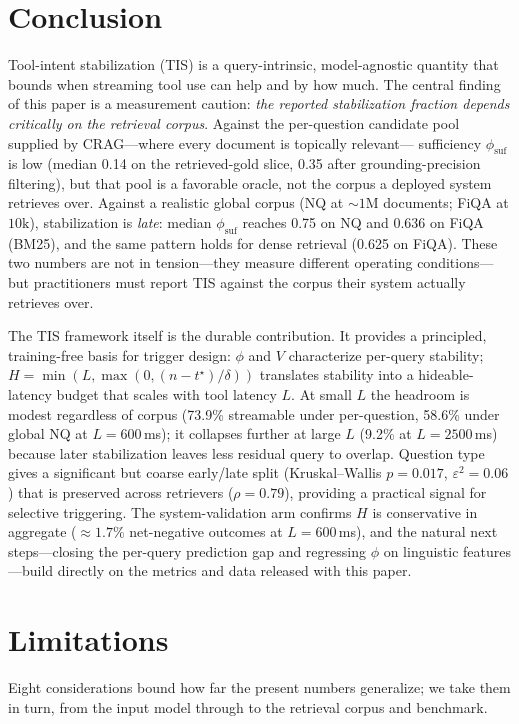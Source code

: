 \documentclass[11pt]{article}
\newcommand{\phiSufMed}{0.14}
\newcommand{\phiSufCleanMed}{0.35}   %
\newcommand{\streamPct}{73.9\%}
\newcommand{\kwAllP}{0.017}
\newcommand{\epsSq}{0.06}            %
\newcommand{\negRateSc}{1.7\%}       %
\newcommand{\rhoDenseType}{0.79}     %
\newcommand{\phiSufGnqOneM}{0.75}    %
\newcommand{\phiSufGfiqaBm}{0.636}   %
\newcommand{\phiSufGfiqaDe}{0.625}   %
\newcommand{\sfPqSix}{73.9\%}        %
\newcommand{\sfNqSix}{58.6\%}        %
\newcommand{\sfNqTwentyfive}{9.2\%}  %
\begin{document}
\section{Conclusion}
Tool-intent stabilization (TIS) is a query-intrinsic, model-agnostic quantity
that bounds when streaming tool use can help and by how much.  The central
finding of this paper is a measurement caution: \emph{the reported stabilization
fraction depends critically on the retrieval corpus}.  Against the per-question
candidate pool supplied by CRAG---where every document is topically relevant---
sufficiency $\phi_{\mathrm{suf}}$ is low (median \phiSufMed{} on the
retrieved-gold slice, \phiSufCleanMed{} after grounding-precision filtering),
but that pool is a favorable oracle, not the corpus a deployed system retrieves
over.  Against a realistic global corpus (NQ at ${\sim}1$M documents; FiQA at
$10\mathrm{k}$), stabilization is \emph{late}: median $\phi_{\mathrm{suf}}$
reaches \phiSufGnqOneM{} on NQ and \phiSufGfiqaBm{} on FiQA (BM25), and the
same pattern holds for dense retrieval (\phiSufGfiqaDe{} on FiQA).  These two
numbers are not in tension---they measure different operating conditions---but
practitioners must report TIS against the corpus their system actually retrieves
over.

The TIS framework itself is the durable contribution.  It provides a
principled, training-free basis for trigger design: $\phi$ and $V$ characterize
per-query stability; $H{=}\min(L,\max(0,(n{-}t^\star)/\delta))$ translates
stability into a hideable-latency budget that scales with tool latency $L$.
At small $L$ the headroom is modest regardless of corpus (\sfPqSix{} streamable
under per-question, \sfNqSix{} under global NQ at $L{=}600$\,ms); it collapses
further at large $L$ (\sfNqTwentyfive{} at $L{=}2500$\,ms) because
later stabilization leaves less residual query to overlap.  Question type gives
a significant but coarse early/late split (Kruskal--Wallis $p{=}\kwAllP{}$,
$\varepsilon^2{=}\epsSq{}$) that is preserved across retrievers
($\rho{=}\rhoDenseType{}$), providing a practical signal for selective
triggering.  The system-validation arm confirms $H$ is conservative in
aggregate ($\approx\negRateSc{}$ net-negative outcomes at $L{=}600$\,ms), and
the natural next steps---closing the per-query prediction gap and regressing
$\phi$ on linguistic features---build directly on the metrics and data released
with this paper.

\section*{Limitations}
Eight considerations bound how far the present numbers generalize; we take them
in turn, from the input model through to the retrieval corpus and benchmark.
\end{document}
